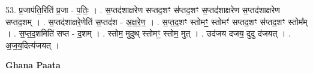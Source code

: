 \documentclass[17pt]{extarticle}
\begin{document}
53. प्र॒जाप॑ति॒रिति॑ प्र॒जा - प॒तिः॒ । . स॒प्तद॑शाक्षरेण सप्तद॒शꣳ स॑प्तद॒शꣳ स॒प्तद॑शाक्षरेण स॒प्तद॑शाक्षरेण सप्तद॒शम् । . स॒प्तद॑शाक्षरे॒णेति॑ स॒प्तद॑श - अ॒क्ष॒रे॒ण॒ । . स॒प्त॒द॒शꣳ स्तोमꣳ॒॒ स्तोमꣳ॑ सप्तद॒शꣳ स॑प्तद॒शꣳ स्तोम᳚म् । . स॒प्त॒द॒शमिति॑ सप्त - द॒शम् । . स्तोम॒ मुदुथ् स्तोमꣳ॒॒ स्तोम॒ मुत् । . उद॑जय दजय॒ दुदु द॑जयत् । . अ॒ज॒य॒दित्य॑जयत् । \newline

\textbf{Ghana Paata } \newline
\end{document}

